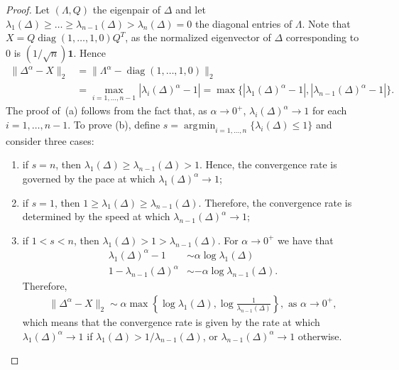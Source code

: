 \documentclass[10pt,a4paper]{amsart}
\DeclareMathOperator*{\argmin}{\arg\!\min}
\DeclareMathOperator{\diag}{diag}
\newcommand{\fL}{\Delta^\alpha}
\begin{document}
\begin{proof}
Let $(\Lambda,Q)$ the eigenpair of $\Delta$ and let $\lambda_1(\Delta)\geq \dots \geq \lambda_{n-1}(\Delta)>\lambda_{n}(\Delta)=0$ the diagonal entries of $\Lambda$. Note that $X = Q \diag(1, \dots, 1, 0)Q^T$, as the normalized eigenvector of $\Delta$ corresponding to 0 is $(1/\sqrt{n})\mathbf{1}$. Hence
\begin{align*} \|\fL - X\|_2 &= \|\Lambda^\alpha - \diag(1, \dots, 1, 0)\|_2 \\
&=
\max_{i=1,...,n-1}{|\lambda_i(\Delta)^\alpha - 1|} = \max\{|\lambda_1(\Delta)^\alpha - 1|, |\lambda_{n-1}(\Delta)^\alpha
 - 1|\}.
\end{align*}
 The proof of~(a) follows from the fact that, as $\alpha\rightarrow0^+$, $\lambda_i(\Delta)^\alpha\rightarrow 1$ for each $i=1,\dots,n-1$. To prove (b), define $s=\argmin_{i=1,\dots,n}\{\lambda_{i}(\Delta)\leq1\}$ and consider three cases:
\begin{enumerate}
    \item if $s=n$, then $\lambda_{1}(\Delta)\geq\lambda_{n-1}(\Delta)>1$. Hence, the convergence rate is governed by the pace at which $\lambda_{1}(\Delta)^\alpha\rightarrow1$;
    \item if $s=1$, then $1\geq \lambda_{1}(\Delta)\geq\lambda_{n-1}(\Delta)$. Therefore, the convergence rate is determined by the speed at which
    $\lambda_{{n-1}}(\Delta)^\alpha\rightarrow1$;
    \item if $1< s < n$, then $\lambda_1(\Delta)>1>\lambda_{n-1}(\Delta)$.
    For $\alpha\rightarrow0^+$ we have that 
    \begin{align*}
        \lambda_{1}(\Delta)^{\alpha} -1 &\sim \alpha \log \lambda_1(\Delta)\\
        1- \lambda_{n-1}(\Delta)^{\alpha} &\sim -\alpha \log \lambda_{n-1}(\Delta).
    \end{align*}
    Therefore,
    \begin{align*}
        \|\Delta^\alpha-X\|_2\sim \alpha \max\left\{\log \lambda_1(\Delta),\log\frac{1}{\lambda_{n-1}(\Delta)}\right\}, \text{ as } \alpha\rightarrow0^+,
    \end{align*}
    which means that the convergence rate is given by the rate at which $\lambda_{{1}}(\Delta)^\alpha\rightarrow1$ if $\lambda_1(\Delta)>1/\lambda_{{n-1}}(\Delta)$, or $\lambda_{{n-1}}(\Delta)^\alpha\rightarrow1$ otherwise. 
\end{enumerate}
\end{proof}
\end{document}
